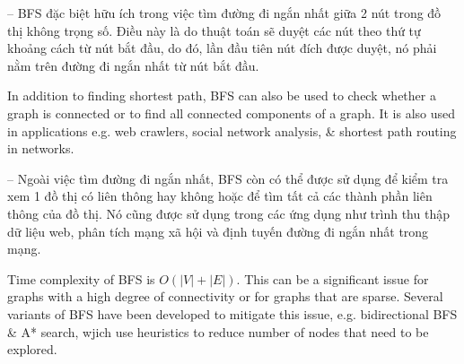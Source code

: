 \documentclass{article}
\begin{document}
\begin{itemize}
\begin{itemize}
\begin{itemize}
            -- BFS đặc biệt hữu ích trong việc tìm đường đi ngắn nhất giữa 2 nút trong đồ thị không trọng số. Điều này là do thuật toán sẽ duyệt các nút theo thứ tự khoảng cách từ nút bắt đầu, do đó, lần đầu tiên nút đích được duyệt, nó phải nằm trên đường đi ngắn nhất từ nút bắt đầu.

            In addition to finding shortest path, BFS can also be used to check whether a graph is connected or to find all connected components of a graph. It is also used in applications e.g. web crawlers, social network analysis, \& shortest path routing in networks.

            -- Ngoài việc tìm đường đi ngắn nhất, BFS còn có thể được sử dụng để kiểm tra xem 1 đồ thị có liên thông hay không hoặc để tìm tất cả các thành phần liên thông của đồ thị. Nó cũng được sử dụng trong các ứng dụng như trình thu thập dữ liệu web, phân tích mạng xã hội và định tuyến đường đi ngắn nhất trong mạng.

            Time complexity of BFS is $O(|V| + |E|)$. This can be a significant issue for graphs with a high degree of connectivity or for graphs that are sparse. Several variants of BFS have been developed to mitigate this issue, e.g. bidirectional BFS \& A* search, wjich use heuristics to reduce number of nodes that need to be explored.


\end{itemize}
\end{itemize}
\end{itemize}
\end{document}
